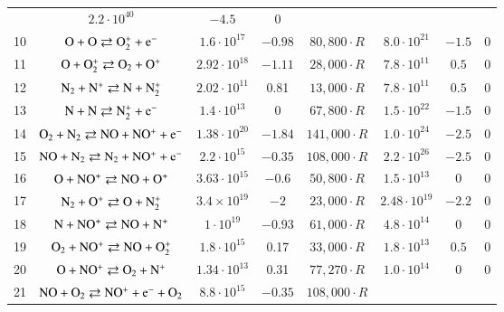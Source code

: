 \documentclass{warpdoc}
\begin{document}
\begin{table}[t]
\begin{center}
\begin{threeparttable}
\begin{tabular}{cccccccc}
                                          & $2.2 \cdot 10^{40}$  & $-4.5$  & 0\\
10 & $\rm O + O \rightleftarrows O_2^{+}+e^-$ & $1.6 \cdot 10^{17}$ & $-0.98$ & $80,800 \cdot R$ 
                                          & $8.0 \cdot 10^{21}$  & $-1.5$  & 0\\
11 & $\rm O + O_2^+ \rightleftarrows O_2+O^+$ & $2.92 \cdot 10^{18}$ & $-1.11$ & $28,000\cdot R$ 
                                          & $7.8 \cdot 10^{11}$  & $0.5$  & 0\\
12 & $\rm N_2 + N^+ \rightleftarrows N+N_2^{+}$ & $2.02 \cdot 10^{11}$ & 0.81 & $13,000 \cdot R$ 
                                          & $7.8 \cdot 10^{11}$  & $0.5$  & 0\\
13 & $\rm N + N \rightleftarrows N_2^{+} + e^-$ & $1.4 \cdot 10^{13}$ & 0 & $67,800\cdot R$ 
                                          & $1.5 \cdot 10^{22}$  & $-1.5$  & 0\\
14 & $\rm O_2 + N_2 \rightleftarrows NO + NO^+ + e^-$ & $1.38 \cdot 10^{20}$ & $-1.84$ & $141,000\cdot R$ 
                                          & $1.0 \cdot 10^{24}$  & $-2.5$  & 0\\
15 & $\rm NO + N_2 \rightleftarrows N_2 + NO^+ + e^-$ & $2.2 \cdot 10^{15}$ & $-0.35$ & $108,000\cdot R$ 
                                          & $2.2 \cdot 10^{26}$  & $-2.5$  & 0\\
16 & $\rm O + NO^+ \rightleftarrows NO + O^+$ & $3.63 \cdot 10^{15}$ & $-0.6$ & $50,800\cdot R$ 
                                          & $1.5 \cdot 10^{13}$  & $0$  & 0\\
17 & $\rm N_2 + O^+ \rightleftarrows O + N_2^{+}$ & $3.4 \times 10^{19}$ & $-2$ & $23,000\cdot R$ 
                                          & $2.48 \cdot 10^{19}$  & $-2.2$  & 0\\
18 & $\rm N + NO^+ \rightleftarrows NO + N^+$ & $1 \cdot 10^{19}$ & $-0.93$ & $61,000\cdot R$ 
                                          & $4.8 \cdot 10^{14}$  & $0$  & 0\\
19 & $\rm O_2 + NO^+ \rightleftarrows NO + O_2^{+}$ & $1.8 \cdot 10^{15}$ & 0.17 & $33,000\cdot R$ 
                                          & $1.8 \cdot 10^{13}$  & $0.5$  & 0\\
20 & $\rm O + NO^+ \rightleftarrows O_2 + N^+$ & $1.34 \cdot 10^{13}$ & 0.31 & $77,270\cdot R$ 
                                          & $1.0 \cdot 10^{14}$  & $0$  & 0\\
21 & $\rm NO + O_2 \rightleftarrows NO^+ + e^- + O_2$ & $8.8 \cdot 10^{15}$ & $-0.35$ & $108,000\cdot R$ 

\end{tabular}
\end{threeparttable}
\end{center}
\end{table}
\end{document}
